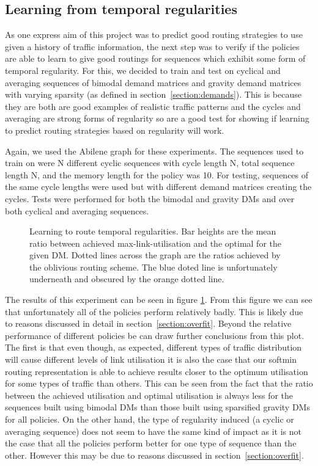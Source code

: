 \subsection{Learning from temporal regularities}
As one express aim of this project was to predict good routing strategies to use given a history of traffic information, the next step was to verify if the policies are able to learn to give good routings for sequences which exhibit some form of temporal regularity. For this, we decided to train and test on cyclical and averaging sequences of bimodal demand matrices and gravity demand matrices with varying sparsity (as defined in section~\ref{section:demands}). This is because they are both are good examples of realistic traffic patterns and the cycles and averaging are strong forms of regularity so are a good test for showing if learning to predict routing strategies based on regularity will work.

Again, we used the Abilene graph for these experiments. The sequences used to train on were N different cyclic sequences with cycle length N, total sequence length N, and the memory length for the policy was 10. For testing, sequences of the same cycle lengths were used but with different demand matrices creating the cycles. Tests were performed for both the bimodal and gravity DMs and over both cyclical and averaging sequences.

\begin{figure}
    \centering
    
    \caption{Learning to route temporal regularities. Bar heights are the mean ratio between achieved max-link-utilisation and the optimal for the given DM. Dotted lines across the graph are the ratios achieved by the oblivious routing scheme. The blue doted line is unfortunately underneath and obscured by the orange dotted line.}
    \label{fig:exp_cyclic}
\end{figure}

The results of this experiment can be seen in figure \ref{fig:exp_cyclic}. From this figure we can see that unfortunately all of the policies perform relatively badly. This is likely due to reasons discussed in detail in section~\ref{section:overfit}. Beyond the relative performance of different policies be can draw further conclusions from this plot. The first is that even though, as expected, different types of traffic distribution will cause different levels of link utilisation it is also the case that our softmin routing representation is able to achieve results closer to the optimum utilisation for some types of traffic than others. This can be seen from the fact that the ratio between the achieved utilisation and optimal utilisation is always less for the sequences built using bimodal DMs than those built using sparsified gravity DMs for all policies. On the other hand, the type of regularity induced (a cyclic or averaging sequence) does not seem to have the same kind of impact as it is not the case that all the policies perform better for one type of sequence than the other. However this may be due to reasons discussed in section~\ref{section:overfit}.

